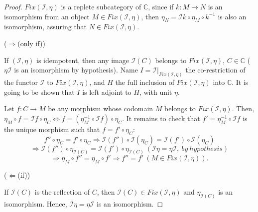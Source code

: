 \documentclass[12pt,a4paper]{amsart}
\theoremstyle{definition}
\begin{document}
\begin{proof}
$Fix(\mathcal{I},\eta)$ is a replete subcategory of $\mathbb{C}$, since if $k:M\rightarrow N$ is an isomorphism from an object $M\in Fix(\mathcal{I},\eta)$, then $\eta_N=\mathcal{I}k\circ\eta_M\circ k^{-1}$ is also an isomorphism, assuring that $N\in Fix(\mathcal{I},\eta)$.

\noindent ($\Rightarrow$(only if))

If $(\mathcal{I},\eta)$ is idempotent, then any image $\mathcal{I}(C)$ belongs to $Fix(\mathcal{I},\eta)$, $C\in\mathbb{C}$ ($\eta \mathcal{I}$ is an isomorphism by hypothesis). Name $I=\mathcal{I}|_{Fix(\mathcal{I},\eta)}$ the co-restriction of the functor $\mathcal{I}$ to $Fix(\mathcal{I},\eta)$, and $H$ the full inclusion of $Fix(\mathcal{I},\eta)$ into $\mathbb{C}$. It is going to be shown that $I$ is left adjoint to $H$, with unit $\eta$.

Let $f:C\rightarrow M$ be any morphism whose codomain $M$ belongs to $Fix(\mathcal{I},\eta)$. Then, $\eta _M\circ f=\mathcal{I}f\circ \eta_C\Leftrightarrow f=(\eta^{-1}_M\circ \mathcal{I}f)\circ \eta_C$. It remains to check that $f'=\eta^{-1}_M\circ\mathcal{I}f$ is the unique morphism such that $f=f'\circ\eta_C$:
$$f''\circ\eta_C=f'\circ\eta_C\Rightarrow \mathcal{I}(f'')\circ\mathcal{I}(\eta_C)=\mathcal{I}(f')\circ\mathcal{I}(\eta_C)
$$
$$\Rightarrow \mathcal{I}(f'')\circ\eta_{\mathcal{I}(C)}=\mathcal{I}(f')\circ\eta_{\mathcal{I}(C)}\ (\mathcal{I}\eta=\eta\mathcal{I},\ by\ hypothesis)$$
$$\Rightarrow \eta_M\circ f''=\eta_M\circ f'\Rightarrow f''=f'\ (M\in Fix(\mathcal{I},\eta)).$$

\noindent ($\Leftarrow$(if))

If $\mathcal{I}(C)$ is the reflection of $C$, then $\mathcal{I}(C)\in Fix(\mathcal{I},\eta)$ and $\eta_{\mathcal{I}(C)}$ is an isomorphism. Hence, $\mathcal{I}\eta =\eta\mathcal{I}$ is an isomorphism.\end{proof}
\end{document}
